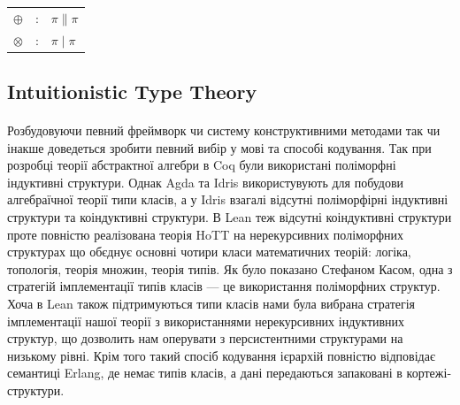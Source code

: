 \documentclass[11pt,oneside]{article}
\begin{document}
\begin{center}
\begin{tabular}{lcl}
$\oplus$   &:& $\pi \parallel \pi$\\
$\otimes$  &:& $\pi \mid \pi$\\
\end{tabular}
\end{center}

%

\newpage
   \subsection{Intuitionistic Type Theory}

   \paragraph{}
   Розбудовуючи певний фреймворк чи систему конструктивними методами
   так чи інакше доведеться зробити певний вибір у мові та способі кодування.
   Так при розробці теорії абстрактної алгебри в Coq були використані
   поліморфні індуктивні структури\cite{coqalg}. Однак Agda та Idris використувують
   для побудови алгебраїчної теорії типи класів, а у Idris взагалі відсутні
   поліморфірні індуктивні структури та коіндуктивні структури. В Lean
   теж відсутні коіндуктивні структури проте повністю реалізована теорія
   HoTT на нерекурсивних поліморфних структурах що обєднує основні чотири
   класи математичних теорій: логіка, топологія, теорія множин, теорія типів.
   Як було показано Стефаном Касом\cite{kaes}, одна з
   стратегій імплементації типів класів --- це використання поліморфних структур.
   Хоча в Lean також підтримуються типи класів нами була вибрана стратегія
   імплементації нашої теорії з використаннями нерекурсивних індуктивних структур,
   що дозволить нам оперувати з персистентними структурами на низькому рівні.
   Крім того такий спосіб кодування ієрархій повністю відповідає семантиці Erlang,
   де немає типів класів, а дані передаються запаковані в кортежі-структури.
\end{document}
